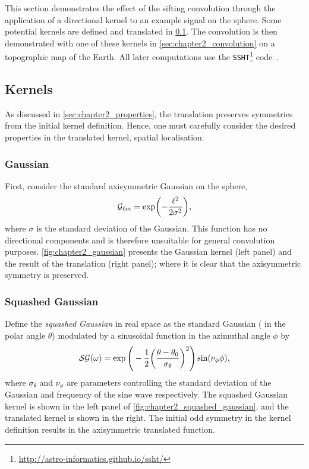 This section demonstrates the effect of the sifting convolution through the application of a directional kernel to an example signal on the sphere.
Some potential kernels are defined and translated in \cref{sec:chapter2_kernels}.
The convolution is then demonstrated with one of these kernels in \cref{sec:chapter2_convolution} on a topographic map of the Earth.
All later computations use the \texttt{SSHT}\footnote{\url{http://astro-informatics.github.io/ssht/}} code~\cite{McEwen2011}.

\subsection{Kernels}\label{sec:chapter2_kernels}

As discussed in \cref{sec:chapter2_properties}, the translation preserves symmetries from the initial kernel definition.
Hence, one must carefully consider the desired properties in the translated kernel, \eg{} spatial localisation.

\subsubsection{Gaussian}

First, consider the standard axisymmetric Gaussian on the sphere, \ie{}
%
\begin{equation}
	{\mathcal{G}}_{\ell m}
	= \exp(-\frac{{\ell}^{2}}{2\sigma^{2}}),
\end{equation}
%
where \(\sigma{}\) is the standard deviation of the Gaussian.
This function has no directional components and is therefore unsuitable for general convolution purposes.
\cref{fig:chapter2_gaussian} presents the Gaussian kernel (left panel) and the result of the translation (right panel); where it is clear that the axisymmetric symmetry is preserved.



\subsubsection{Squashed Gaussian}

Define the \emph{squashed Gaussian} in real space as the standard Gaussian (\ie{} in the polar angle \(\theta{}\)) modulated by a sinusoidal function in the azimuthal angle \(\phi{}\) by
%
\begin{equation}
	\mathcal{SG}(\omega)
	= \exp\Bigg(-\frac{1}{2}{\bigg(\frac{\theta-\theta_{0}}{\sigma_{\theta}}\bigg)}^{2}\Bigg)
	\sin(\nu_{\phi}\phi),
\end{equation}
%
where \(\sigma_{\theta}\) and \(\nu_{\phi}\) are parameters controlling the standard deviation of the Gaussian and frequency of the sine wave respectively.
The squashed Gaussian kernel is shown in the left panel of \cref{fig:chapter2_squashed_gaussian}, and the translated kernel is shown in the right.
The initial odd symmetry in the kernel definition results in the axisymmetric translated function.

